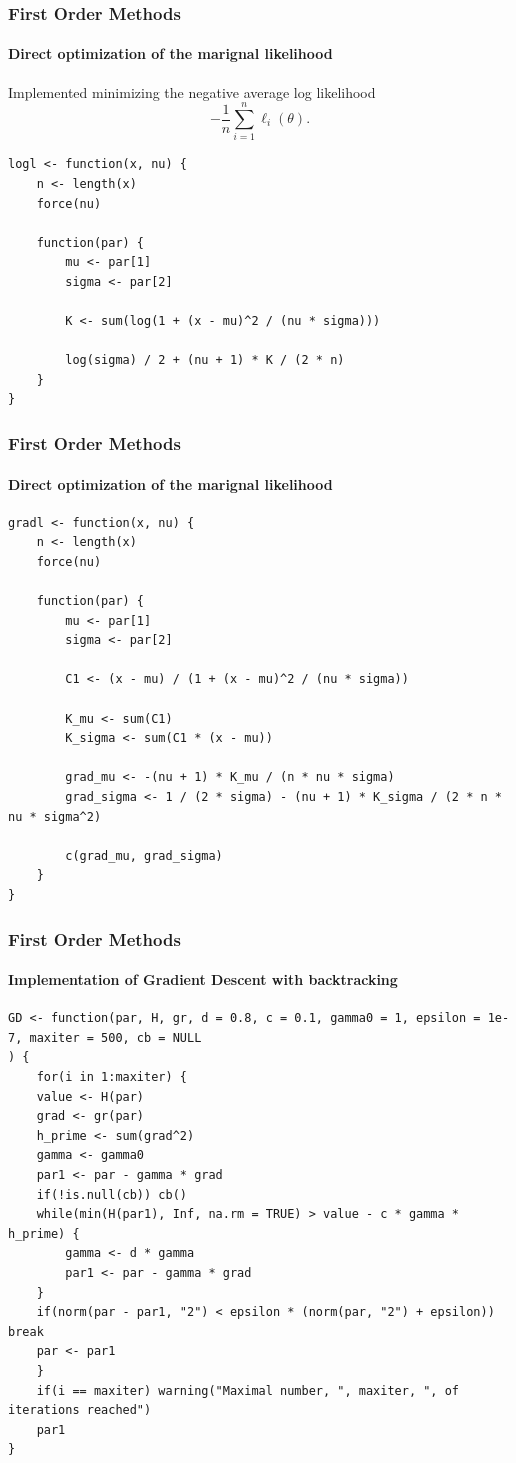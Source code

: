 \documentclass[aspectratio=169]{beamer}
\begin{document}
\begin{frame}[fragile]
    \frametitle{First Order Methods}
    \framesubtitle{Direct optimization of the marignal likelihood}
    Implemented minimizing the negative average log likelihood
    \begin{equation}
        -\frac{1}{n}\sum_{i=1}^{n}\ell_{i}(\theta).
    \end{equation}
\begin{verbatim}
logl <- function(x, nu) {
    n <- length(x)
    force(nu)
    
    function(par) {
        mu <- par[1]
        sigma <- par[2]
        
        K <- sum(log(1 + (x - mu)^2 / (nu * sigma)))
        
        log(sigma) / 2 + (nu + 1) * K / (2 * n)
    }
}
\end{verbatim}
\end{frame}
\begin{frame}[fragile]
    \frametitle{First Order Methods}
    \framesubtitle{Direct optimization of the marignal likelihood}
\begin{verbatim}
gradl <- function(x, nu) {
    n <- length(x)
    force(nu)
    
    function(par) {
        mu <- par[1]
        sigma <- par[2]
        
        C1 <- (x - mu) / (1 + (x - mu)^2 / (nu * sigma))
        
        K_mu <- sum(C1)
        K_sigma <- sum(C1 * (x - mu))
        
        grad_mu <- -(nu + 1) * K_mu / (n * nu * sigma)
        grad_sigma <- 1 / (2 * sigma) - (nu + 1) * K_sigma / (2 * n * nu * sigma^2)
        
        c(grad_mu, grad_sigma)
    }
}
\end{verbatim}
\end{frame}
\begin{frame}[fragile]
    \frametitle{First Order Methods}
    \framesubtitle{Implementation of Gradient Descent with backtracking}
\begin{verbatim}
GD <- function(par, H, gr, d = 0.8, c = 0.1, gamma0 = 1, epsilon = 1e-7, maxiter = 500, cb = NULL
) {
    for(i in 1:maxiter) {
    value <- H(par)
    grad <- gr(par)
    h_prime <- sum(grad^2)
    gamma <- gamma0
    par1 <- par - gamma * grad
    if(!is.null(cb)) cb()
    while(min(H(par1), Inf, na.rm = TRUE) > value - c * gamma * h_prime) {
        gamma <- d * gamma
        par1 <- par - gamma * grad
    }
    if(norm(par - par1, "2") < epsilon * (norm(par, "2") + epsilon)) break
    par <- par1
    }
    if(i == maxiter) warning("Maximal number, ", maxiter, ", of iterations reached")
    par1
}    
\end{verbatim}
\end{frame}
\end{document}
